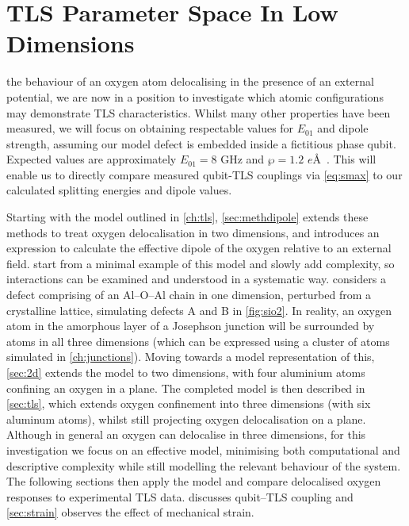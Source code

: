 \versoquote{\raisebox{-1.5em}{\resizebox{!}{2.15em}{}}}{\raisebox{-0.7em}{\resizebox{!}{1.7em}{}}}
\chapter[TLSs In Low Dimensions]{TLS Parameter Space In Low Dimensions}\label{ch:lowdims}

 the behaviour of an oxygen atom delocalising in the presence of an external potential, we are now in a position to investigate which atomic configurations may demonstrate TLS characteristics.
Whilst many other properties have been measured, we will focus on obtaining respectable values for $E_{01}$ and dipole strength, assuming our model defect is embedded inside a fictitious phase qubit.
Expected values are approximately $E_{01}=8$ GHz and $\wp=1.2$ $e$\AA~\cite{Cole2010}.
This will enable us to directly compare measured qubit-TLS couplings via \cref{eq:smax} to our calculated splitting energies and dipole values.

Starting with the model outlined in \cref{ch:tls}, \cref{sec:methdipole} extends these methods to treat oxygen delocalisation in two dimensions, and introduces an expression to calculate the effective dipole of the oxygen relative to an external field.
 start from a minimal example of this model and slowly add complexity, so interactions can be examined and understood in a systematic way.
 considers a defect comprising of an Al--O--Al chain in one dimension, perturbed from a crystalline lattice, simulating defects A and B in \cref{fig:sio2}.
In reality, an oxygen atom in the amorphous layer of a Josephson junction will be surrounded by atoms in all three dimensions (which can be expressed using a cluster of atoms simulated in \cref{ch:junctions}).
Moving towards a model representation of this, \cref{sec:2d} extends the model to two dimensions, with four aluminium atoms confining an oxygen in a plane.
The completed model is then described in \cref{sec:tls}, which extends oxygen confinement into three dimensions (with six aluminum atoms), whilst still projecting oxygen delocalisation on a plane.
Although in general an oxygen can delocalise in three dimensions, for this investigation we focus on an effective  model, minimising both computational and descriptive complexity while still modelling the relevant behaviour of the system.
The following sections then apply the  model and compare delocalised oxygen responses to experimental TLS data.
 discusses qubit--TLS coupling and \cref{sec:strain} observes the effect of mechanical strain.

